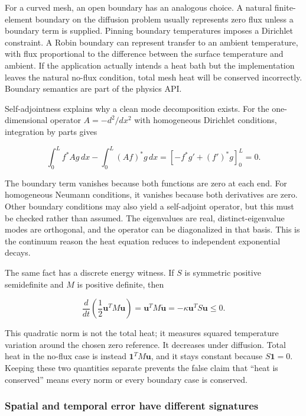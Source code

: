 For a curved mesh, an open boundary has an analogous choice. A natural finite-element boundary on the diffusion problem usually represents zero flux unless a boundary term is supplied. Pinning boundary temperatures imposes a Dirichlet constraint. A Robin boundary can represent transfer to an ambient temperature, with flux proportional to the difference between the surface temperature and ambient. If the application actually intends a heat bath but the implementation leaves the natural no-flux condition, total mesh heat will be conserved incorrectly. Boundary semantics are part of the physics API.

Self-adjointness explains why a clean mode decomposition exists. For the one-dimensional operator \(A=-d^2/dx^2\) with homogeneous Dirichlet conditions, integration by parts gives

\[
\int_0^L f^*Ag\,dx-\int_0^L(Af)^*g\,dx
=\left[-f^*g'+(f')^*g\right]_0^L=0.
\]

The boundary term vanishes because both functions are zero at each end. For homogeneous Neumann conditions, it vanishes because both derivatives are zero. Other boundary conditions may also yield a self-adjoint operator, but this must be checked rather than assumed. The eigenvalues are real, distinct-eigenvalue modes are orthogonal, and the operator can be diagonalized in that basis. This is the continuum reason the heat equation reduces to independent exponential decays.

The same fact has a discrete energy witness. If \(S\) is symmetric positive semidefinite and \(M\) is positive definite, then

\[
\frac{d}{dt}\left(\frac12\mathbf u^TM\mathbf u\right)
=\mathbf u^TM\dot{\mathbf u}
=-\kappa\mathbf u^TS\mathbf u\le0.
\]

This quadratic norm is not the total heat; it measures squared temperature variation around the chosen zero reference. It decreases under diffusion. Total heat in the no-flux case is instead \(\mathbf1^TM\mathbf u\), and it stays constant because \(S\mathbf1=0\). Keeping these two quantities separate prevents the false claim that ``heat is conserved'' means every norm or every boundary case is conserved.

\subsubsection{Spatial and temporal error have different signatures}\label{02-foundations-ii-ch025-spatial-and-temporal-error-have-different-signatures}

